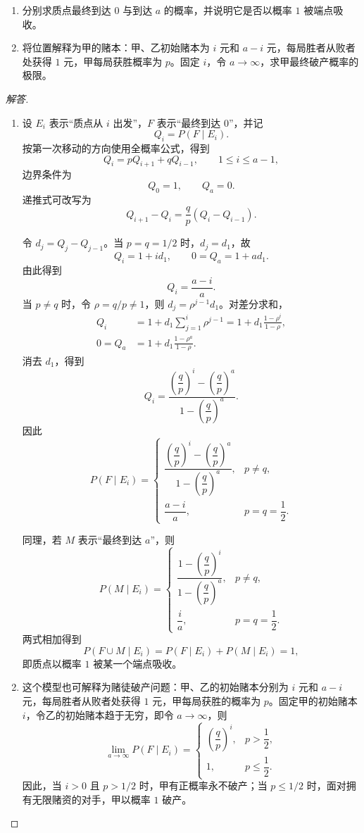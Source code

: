 \begin{enumerate}
\item 分别求质点最终到达 $0$ 与到达 $a$ 的概率，并说明它是否以概率 $1$ 被端点吸收。
\item 将位置解释为甲的赌本：甲、乙初始赌本为 $i$ 元和 $a-i$ 元，每局胜者从败者处获得 $1$ 元，甲每局获胜概率为 $p$。固定 $i$，令 $a\to\infty$，求甲最终破产概率的极限。
\end{enumerate}

\begin{proof}[解答]
\begin{enumerate}
\item 设 $E_i$ 表示“质点从 $i$ 出发”，$F$ 表示“最终到达 $0$”，并记
\[
Q_i=P(F\mid E_i).
\]
按第一次移动的方向使用全概率公式，得到
\[
Q_i=pQ_{i+1}+qQ_{i-1},
\qquad 1\leq i\leq a-1,
\]
边界条件为
\[
Q_0=1,
\qquad
Q_a=0.
\]
递推式可改写为
\[
Q_{i+1}-Q_i=\frac{q}{p}(Q_i-Q_{i-1}).
\]

令 $d_j=Q_j-Q_{j-1}$。当 $p=q=1/2$ 时，$d_j=d_1$，故
\[Q_i=1+id_1,\qquad 0=Q_a=1+ad_1.\]
由此得到
\[
Q_i=\frac{a-i}{a}.
\]
当 $p\ne q$ 时，令 $\rho=q/p\ne1$，则 $d_j=\rho^{j-1}d_1$。对差分求和，
\begin{align*}
Q_i&=1+d_1\sum_{j=1}^i\rho^{j-1}=1+d_1\frac{1-\rho^i}{1-\rho},\\
0=Q_a&=1+d_1\frac{1-\rho^a}{1-\rho}.
\end{align*}
消去 $d_1$，得到
\[
Q_i
=\frac{\left(\dfrac qp\right)^i-\left(\dfrac qp\right)^a}
{1-\left(\dfrac qp\right)^a}.
\]
因此
\[
P(F\mid E_i)=
\begin{cases}
\dfrac{\left(\dfrac qp\right)^i-\left(\dfrac qp\right)^a}
{1-\left(\dfrac qp\right)^a},&p\ne q,\\[1.2em]
\dfrac{a-i}{a},&p=q=\dfrac12.
\end{cases}
\]

同理，若 $M$ 表示“最终到达 $a$”，则
\[
P(M\mid E_i)=
\begin{cases}
\dfrac{1-\left(\dfrac qp\right)^i}
{1-\left(\dfrac qp\right)^a},&p\ne q,\\[1.2em]
\dfrac{i}{a},&p=q=\dfrac12.
\end{cases}
\]
两式相加得到
\[
P(F\cup M\mid E_i)=P(F\mid E_i)+P(M\mid E_i)=1,
\]
即质点以概率 $1$ 被某一个端点吸收。
\item 这个模型也可解释为赌徒破产问题：甲、乙的初始赌本分别为 $i$ 元和 $a-i$ 元，每局胜者从败者处获得 $1$ 元，甲每局获胜的概率为 $p$。固定甲的初始赌本 $i$，令乙的初始赌本趋于无穷，即令 $a\to\infty$，则
\[
\lim_{a\to\infty}P(F\mid E_i)=
\begin{cases}
\left(\dfrac qp\right)^i,&p>\dfrac12,\\[0.8em]
1,&p\leq\dfrac12.
\end{cases}
\]
因此，当 $i>0$ 且 $p>1/2$ 时，甲有正概率永不破产；当 $p\leq1/2$ 时，面对拥有无限赌资的对手，甲以概率 $1$ 破产。
\end{enumerate}
\end{proof}

